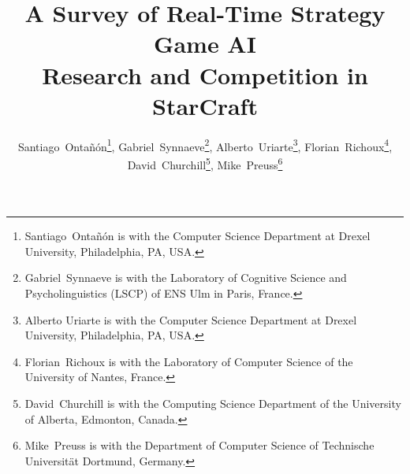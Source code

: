 \documentclass[journal]{IEEEtran}
\begin{document}
%
\title{A Survey of Real-Time Strategy Game AI\\ Research and Competition in StarCraft}
%
%
%


\author{Santiago~Onta\~{n}\'{o}n\thanks{Santiago~Onta\~{n}\'{o}n is with the Computer Science Department at Drexel University, Philadelphia, PA, USA.},
        Gabriel~Synnaeve\thanks{Gabriel~Synnaeve is with the Laboratory of Cognitive Science and Psycholinguistics (LSCP) of ENS Ulm in Paris, France.},
        Alberto~Uriarte\thanks{Alberto Uriarte is with the Computer Science Department at Drexel University, Philadelphia, PA, USA.},
        Florian~Richoux\thanks{Florian~Richoux is with the Laboratory of Computer Science of the University of Nantes, France.},
        David~Churchill\thanks{David~Churchill is with the Computing Science Department of the University of Alberta, Edmonton, Canada.},
        Mike~Preuss\thanks{Mike~Preuss is with the Department of Computer Science of Technische Universit{\"a}t Dortmund, Germany.}}



% 
%
\end{document}
